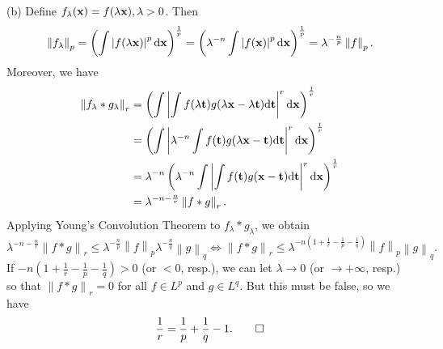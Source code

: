 \begin{exercise}{9.2}
  (b) Define $f_{\lambda}(\mathbf{x}) = f(\lambda \mathbf{x}), \lambda > 0$.
  Then
  \[
    \left\| f_\lambda \right\|_p
    = \left( \int \left|f(\lambda \mathbf{x})\right|^p \mathrm{d} \mathbf{x} \right)^{\frac 1p}
    = \left( \lambda^{-n} \int \left|f(\mathbf{x})\right|^p \mathrm{d} \mathbf{x} \right)^{\frac 1p}
    = \lambda^{-\frac{n}{p}} \left\| f \right\|_p.
  \]
  Moreover, we have
  \[
    \begin{aligned}
      \left\| f_{\lambda}*g_{\lambda} \right\|_r
      &= \left( \int \left|
      \int f(\lambda\mathbf{t}) g(\lambda\mathbf{x}-\lambda\mathbf{t}) \mathrm{d} \mathbf{t}
      \right|^r \mathrm{d} \mathbf{x} \right)^{\frac 1r} \\
      &= \left( \int \left|
      \lambda^{-n} \int f(\mathbf{t}) g(\lambda\mathbf{x}-\mathbf{t}) \mathrm{d} \mathbf{t}
      \right|^r \mathrm{d} \mathbf{x} \right)^{\frac 1r} \\
      &= \lambda^{-n} \left( \lambda^{-n} \int \left|
      \int f(\mathbf{t}) g(\mathbf{x}-\mathbf{t}) \mathrm{d} \mathbf{t}
      \right|^r \mathrm{d} \mathbf{x} \right)^{\frac 1r} \\
      &= \lambda^{-n - \frac nr} \left\| f*g \right\|_r.
    \end{aligned}
  \]
  Applying Young's Convolution Theorem to $f_{\lambda} * g_{\lambda}$,
  we obtain
  \[
    \lambda^{-n - \frac nr} \left\| f*g \right\|_r
    \le \lambda^{-\frac n p} \left\| f \right\|_p
    \lambda^{-\frac n q} \left\| g \right\|_q
    \Longleftrightarrow
    \left\| f*g \right\|_r \le
    \lambda^{-n\left( 1 + \frac1r - \frac 1p - \frac 1q \right)}
    \left\| f \right\|_p \left\| g \right\|_q.
  \]
  If $-n\left( 1 + \frac1r - \frac 1p - \frac 1q \right) > 0$
  (or $<0$, resp.),
  we can let $\lambda \rightarrow 0$
  (or $\rightarrow +\infty$, resp.)
  so that $\left\| f*g \right\|_r = 0$ for all $f \in L^p$ and $g \in L^q$.
  But this must be false, so we have
  \[
    \frac{1}{r} = \frac{1}{p} + \frac{1}{q} - 1.
    \qedhere
  \]
\end{exercise}
